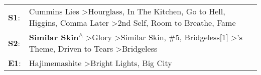 \begin{supertabular}{p{0.03\textwidth}p{0.92\textwidth}}
 \textbf{S1}:  &    Cummins Lies\textsuperscript{} \textgreater \enspace Hourglass\textsuperscript{}, \enspace In The Kitchen\textsuperscript{}, \enspace Go to Hell\textsuperscript{}, \enspace Higgins\textsuperscript{}, \enspace Comma Later\textsuperscript{} \textgreater \enspace 2nd Self\textsuperscript{}, \enspace Room to Breathe\textsuperscript{}, \enspace Fame\textsuperscript{}  \enspace  \\
 \textbf{S2}:  &  \textbf{Similar Skin\textsuperscript{$\wedge$}} \textgreater \enspace Glory\textsuperscript{} \textgreater \enspace Similar Skin\textsuperscript{}, \enspace \#5\textsuperscript{}, \enspace Bridgeless[1]\textsuperscript{} \textgreater {}'s Theme\textsuperscript{}, \enspace Driven to Tears\textsuperscript{} \textgreater \enspace Bridgeless\textsuperscript{}  \enspace  \\
 \textbf{E1}:  &                                                                                                                                                                                                                                                                                 Hajimemashite\textsuperscript{} \textgreater \enspace Bright Lights, Big City\textsuperscript{}  \enspace  \\
\end{supertabular}
